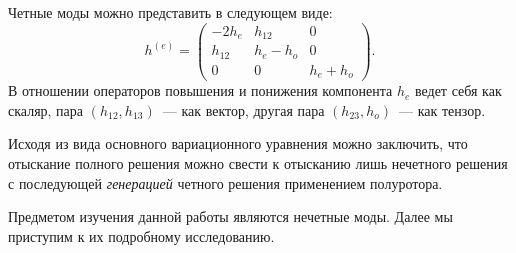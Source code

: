 \documentclass[\docroot/reports/draft/report.tex]{subfiles}
\begin{document}
    Четные моды можно представить в следующем виде:
    \begin{equation}
        h^{(e)} = \begin{pmatrix}-2h_e&h_{12}&0\\h_{12}&h_e-h_o&0\\0&0&h_e+h_o\end{pmatrix} .
    \end{equation}
    В отношении операторов повышения и понижения компонента $h_e$ ведет себя как скаляр, пара $(h_{12},h_{13})$~--- как вектор, другая пара $(h_{23},h_o)$~--- как тензор.

    Исходя из вида основного вариационного уравнения можно заключить, что отыскание полного решения можно свести к отысканию лишь нечетного решения с последующей \textit{генерацией} четного решения применением полуротора.

    Предметом изучения данной работы являются нечетные моды. Далее мы приступим к их подробному исследованию.
\end{document}
